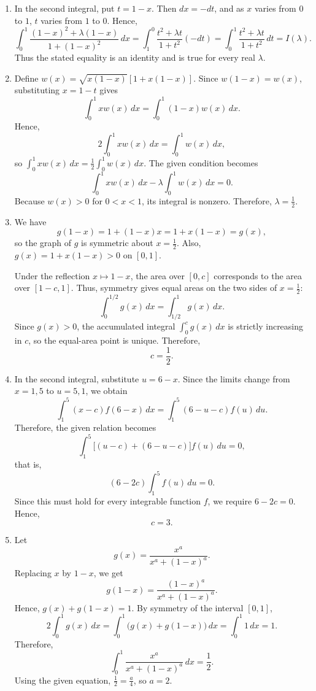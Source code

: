 \documentclass[11pt,a4paper]{article}
\begin{document}
\begin{enumerate}
\item In the second integral, put \(t=1-x\). Then \(dx=-dt\), and as \(x\) varies from \(0\) to \(1\), \(t\) varies from \(1\) to \(0\). Hence,
\[
\int_{0}^{1}\frac{(1-x)^2+\lambda(1-x)}{1+(1-x)^2}\,dx
=\int_{1}^{0}\frac{t^2+\lambda t}{1+t^2}(-dt)
=\int_{0}^{1}\frac{t^2+\lambda t}{1+t^2}\,dt
=I(\lambda).
\]
Thus the stated equality is an identity and is true for every real \(\lambda\).
\item Define \(w(x)=\sqrt{x(1-x)}[1+x(1-x)]\). Since \(w(1-x)=w(x)\), substituting \(x=1-t\) gives
\[
\int_0^1 xw(x)\,dx=\int_0^1 (1-x)w(x)\,dx.
\]
Hence,
\[
2\int_0^1 xw(x)\,dx=\int_0^1 w(x)\,dx,
\]
so \(\int_0^1 xw(x)\,dx=\frac12\int_0^1w(x)\,dx\). The given condition becomes
\[
\int_0^1xw(x)\,dx-\lambda\int_0^1w(x)\,dx=0.
\]
Because \(w(x)>0\) for \(0<x<1\), its integral is nonzero. Therefore, \(\lambda=\frac12\).
\item We have
\[
g(1-x)=1+(1-x)x=1+x(1-x)=g(x),
\]
so the graph of $g$ is symmetric about $x=\frac12$. Also, $g(x)=1+x(1-x)>0$ on $[0,1]$.

Under the reflection $x\mapsto 1-x$, the area over $[0,c]$ corresponds to the area over $[1-c,1]$. Thus, symmetry gives equal areas on the two sides of $x=\frac12$:
\[
\int_0^{1/2}g(x)\,dx=\int_{1/2}^1g(x)\,dx.
\]
Since $g(x)>0$, the accumulated integral $\int_0^c g(x)\,dx$ is strictly increasing in $c$, so the equal-area point is unique. Therefore,
\[
\boxed{c=\frac12}.
\]
\item In the second integral, substitute $u=6-x$. Since the limits change from $x=1,5$ to $u=5,1$, we obtain
\[
\int_{1}^{5}(x-c)f(6-x)\,dx=\int_{1}^{5}(6-u-c)f(u)\,du.
\]
Therefore, the given relation becomes
\[
\int_{1}^{5}\bigl[(u-c)+(6-u-c)\bigr]f(u)\,du=0,
\]
that is,
\[
(6-2c)\int_{1}^{5}f(u)\,du=0.
\]
Since this must hold for every integrable function $f$, we require $6-2c=0$. Hence,
\[
\boxed{c=3}.
\]
\item Let
\[
g(x)=\frac{x^a}{x^a+(1-x)^a}.
\]
Replacing $x$ by $1-x$, we get
\[
g(1-x)=\frac{(1-x)^a}{x^a+(1-x)^a}.
\]
Hence, $g(x)+g(1-x)=1$. By symmetry of the interval $[0,1]$,
\[
2\int_0^1 g(x)\,dx=\int_0^1\bigl(g(x)+g(1-x)\bigr)\,dx=\int_0^1 1\,dx=1.
\]
Therefore,
\[
\int_0^1 \frac{x^a}{x^a+(1-x)^a}\,dx=\frac12.
\]
Using the given equation, $\frac12=\frac{a}{4}$, so $a=2$.
\end{enumerate}
\end{document}

